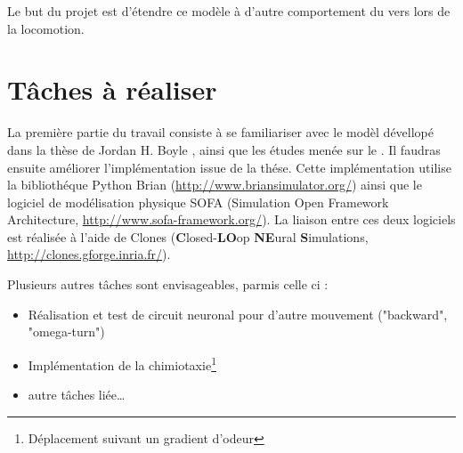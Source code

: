 Le but du projet est d'étendre ce modèle à d'autre comportement du vers lors de la locomotion.


\section{Tâches à réaliser} %
\label{sec:Tâches à réaliser}

La première partie du travail consiste à se familiariser avec le modèl dévellopé dans la thèse de Jordan
H. Boyle \cite{Boyle2009}, ainsi que les études menée sur le \celeg{}. Il faudras ensuite améliorer
l'implémentation issue de la thése. Cette implémentation utilise la bibliothéque Python Brian
(\url{http://www.briansimulator.org/}) ainsi que le logiciel de modélisation physique SOFA
(Simulation Open Framework Architecture, \url{http://www.sofa-framework.org/}). La liaison entre ces
deux logiciels est réalisée à l'aide de Clones (\textbf{C}losed-\textbf{LO}op \textbf{NE}ural \textbf{S}imulations, 
\url{http://clones.gforge.inria.fr/}).

Plusieurs autres tâches sont envisageables, parmis celle ci :
\begin{itemize}
   \item Réalisation et test de circuit neuronal pour d'autre mouvement ("backward", "omega-turn")
   \item Implémentation de la chimiotaxie\footnote{Déplacement suivant un gradient d'odeur}
   \item autre tâches liée\dots
\end{itemize}




